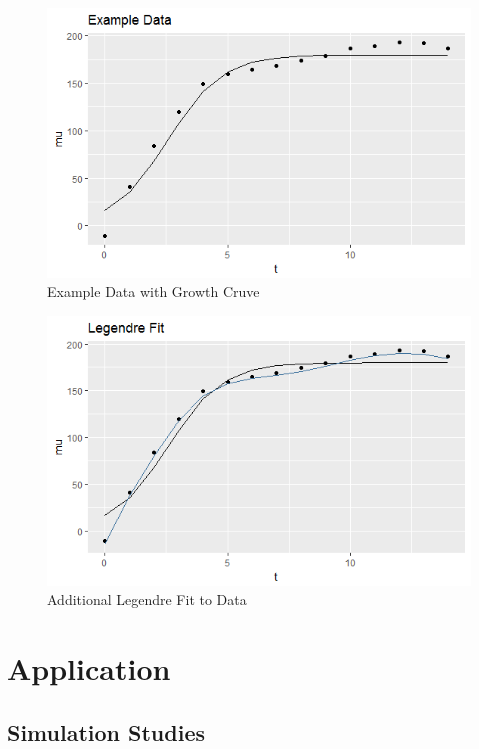 \documentclass[11pt,]{book}
\theoremstyle{definition}
\theoremstyle{definition}
\theoremstyle{remark}
\begin{document}
\begin{figure}

{\centering \includegraphics[width=0.8\linewidth]{images/ExampleDataGrowthCurve} 

}

\caption{Example Data with Growth Cruve}\label{fig:growth-exampledata}
\end{figure}

\begin{figure}

{\centering \includegraphics[width=0.8\linewidth]{images/LegendreFit} 

}

\caption{Additional Legendre Fit to Data}\label{fig:legendre-fit}
\end{figure}

\section{Application}\label{application-2}

\subsection{Simulation Studies}\label{simulation-studies-1}
\end{document}
